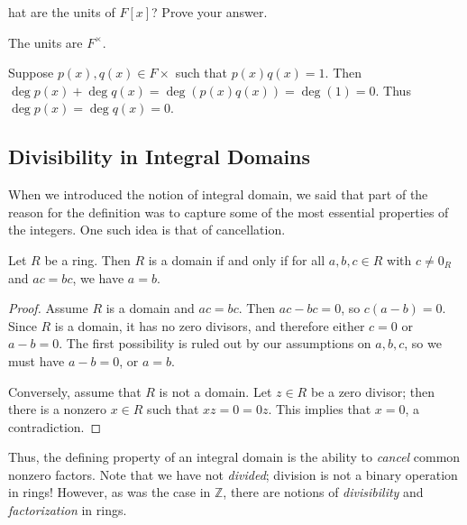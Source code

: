 \documentclass[english,course]{lecture}
\theoremstyle{plain}
\newenvironment{question}[1]
  {\renewcommand\theinnerquestion{#1}\innerquestion}
  {\endinnerquestion}
\def\Z{{\mathbb Z}}
\def\presnotes{}
\begin{document}
\presnotes
	
	
\begin{question}
	What are the units of $F[x]$? Prove your answer.
\end{question}

\begin{answer}
	The units are $F^\times$.
	
	Suppose $p(x),q(x)\in F\times$ such that $p(x) q(x) = 1$.
	Then $\deg p(x) + \deg q(x) = \deg(p(x) q(x)) = \deg(1) = 0$.
	Thus $\deg p(x) = \deg q(x) = 0$.
\end{answer}

\presnotes







\subsection{Divisibility in Integral Domains}

When we introduced the notion of integral domain, we said that part of the reason for the definition was to capture some of the most essential properties of the integers.
One such idea is that of cancellation.

\begin{theorem}
	Let $R$ be a ring.
	Then $R$ is a domain if and only if for all $a,b,c\in R$ with $c\ne 0_R$ and $ac = bc$, we have $a = b$.
\end{theorem}


\begin{proof}
	Assume $R$ is a domain and $ac = bc$.
	Then $ac - bc = 0$, so $c(a-b) = 0$.
	Since $R$ is a domain, it has no zero divisors, and therefore either $c = 0$ or $a-b=0$.
	The first possibility is ruled out by our assumptions on $a,b,c$, so we must have $a-b = 0$, or $a =b$.
	
	Conversely, assume that $R$ is not a domain.
	Let $z\in R$ be a zero divisor; then there is a nonzero $x\in R$ such that $xz = 0 = 0 z$.
	This implies that $x = 0$, a contradiction.
\end{proof}

\presnotes

Thus, the defining property of an integral domain is the ability to \emph{cancel} common nonzero factors. 
Note that we have not \emph{divided}; division is not a binary operation in rings!
However, as was the case in $\Z$, there are notions of \emph{divisibility} and \emph{factorization} in rings.
\end{document}
